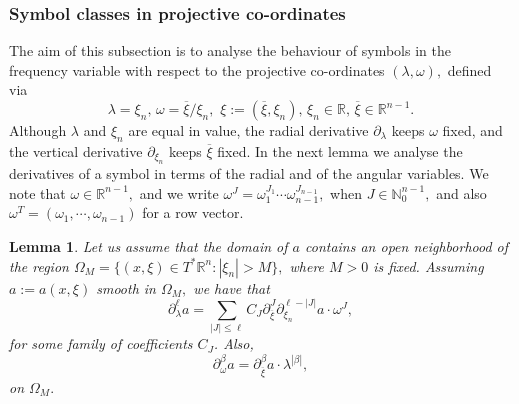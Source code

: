 \documentclass[12pt, reqno]{amsart}
\newtheorem{lemma}[theorem]{Lemma}
\theoremstyle{definition}
\theoremstyle{remark}
\numberwithin{equation}{section}
\begin{document}
\subsubsection{Symbol classes in projective co-ordinates}

The aim of this subsection is to analyse the behaviour of symbols in the frequency variable with respect to the projective co-ordinates $(\lambda,\omega),$ defined via
\begin{equation}
    \lambda=\xi_n,\,\omega=\overline{\xi}/\xi_n,\,\,\xi:=(\overline{\xi},\xi_n),\,\xi_n\in \mathbb{R},\,\overline{\xi}\in \mathbb{R}^{n-1}.
\end{equation}Although $\lambda$ and $\xi_n$ are equal in value, the radial derivative $\partial_\lambda$ keeps $\omega$ fixed, and the vertical derivative $\partial_{\xi_n}$ keeps $\overline{\xi}$ fixed. In the next lemma we analyse the derivatives of a symbol in terms of the radial and of the angular variables. We note that $\omega\in \mathbb{R}^{n-1},$ and we write $\omega^{J}=\omega_1^{J_1}\cdots\omega_{n-1}^{J_{n-1}},$ when $J\in \mathbb{N}_0^{n-1},$ and also $\omega^{T}=(\omega_1,\cdots,\omega_{n-1})$ for a row vector. 
\begin{lemma}\label{Lemma:1:1} Let us assume that the domain of $a$ contains an open neighborhood of the region $\Omega_M=\{(x,\xi)\in T^{*}\mathbb{R}^n:|\xi_n|>M\},$ where $M>0$ is fixed. Assuming $a:=a(x,\xi)$ smooth in $\Omega_M,$ we have that
\begin{equation}\label{lemma:1}
     \partial^\ell_\lambda a=\sum_{|J|\leq \ell }C_{J}\partial_{\overline{\xi}}^{J}\partial_{\xi_n}^{\ell-|J|}a\cdot \omega^{J},
\end{equation}for some family of coefficients $C_{J}$. Also, 
\begin{equation}\label{lemma:2}
   \partial_\omega^{\beta}a=\partial_{\overline{\xi}}^{\beta}a\cdot  \lambda^{|\beta|},
\end{equation}on $\Omega_M.$
    
\end{lemma}
\end{document}

